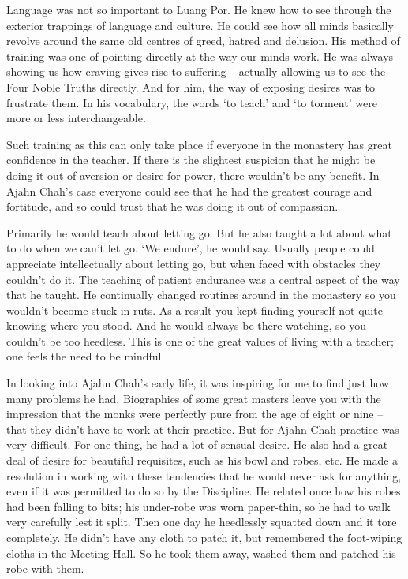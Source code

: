 Language was not so important to Luang Por. He knew how to see through
the exterior trappings of language and culture. He could see how all
minds basically revolve around the same old centres of greed, hatred and
delusion. His method of training was one of pointing directly at the way
our minds work. He was always showing us how craving gives rise to
suffering -- actually allowing us to see the Four Noble Truths directly.
And for him, the way of exposing desires was to frustrate them. In his
vocabulary, the words `to teach' and `to torment' were more or less
interchangeable.

Such training as this can only take place if everyone in the monastery
has great confidence in the teacher. If there is the slightest suspicion
that he might be doing it out of aversion or desire for power, there
wouldn't be any benefit. In Ajahn Chah's case everyone could see that he
had the greatest courage and fortitude, and so could trust that he was
doing it out of compassion.

Primarily he would teach about letting go. But he also taught a lot
about what to do when we can't let go. `We endure', he would say.
Usually people could appreciate intellectually about letting go, but
when faced with obstacles they couldn't do it. The teaching of patient
endurance was a central aspect of the way that he taught. He continually
changed routines around in the monastery so you wouldn't become stuck in
ruts. As a result you kept finding yourself not quite knowing where you
stood. And he would always be there watching, so you couldn't be too
heedless. This is one of the great values of living with a teacher; one
feels the need to be mindful.

In looking into Ajahn Chah's early life, it was inspiring for me to find
just how many problems he had. Biographies of some great masters leave
you with the impression that the monks were perfectly pure from the age
of eight or nine -- that they didn't have to work at their practice. But
for Ajahn Chah practice was very difficult. For one thing, he had a lot
of sensual desire. He also had a great deal of desire for beautiful
requisites, such as his bowl and robes, etc. He made a resolution in
working with these tendencies that he would never ask for anything, even
if it was permitted to do so by the Discipline. He related once how his
robes had been falling to bits; his under-robe was worn paper-thin, so
he had to walk very carefully lest it split. Then one day he heedlessly
squatted down and it tore completely. He didn't have any cloth to patch
it, but remembered the foot-wiping cloths in the Meeting Hall. So he
took them away, washed them and patched his robe with them.


